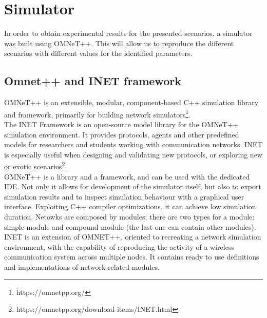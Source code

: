 %
\chapter{Simulator}\label{simulator}
In order to obtain experimental results for the presented scenarios, a simulator
was built using OMNeT++. This will allow us to reproduce the different scenarios
with different values for the identified parameters.\\
\section{Omnet++ and INET framework}
OMNeT++ is an extensible, modular, component-based C++ simulation library and
framework, primarily for building network simulators\footnote{https://omnetpp.org/}.\\
The INET Framework is an open-source model library for the OMNeT++ simulation
environment. It provides protocols, agents and other predefined models for
researchers and students working with communication networks. INET is especially
useful when designing and validating new protocols, or exploring new or exotic
scenarios\footnote{https://omnetpp.org/download-items/INET.html}.\\
OMNeT++ is a library and a framework, and can be used with the dedicated IDE.
Not only it allows for development of the simulator itself, but also to export
simulation results and to inspect simulation behaviour with a graphical user
interface. Exploiting C++ compiler optimizations, it can achieve low simulation
duration. Netowks are composed by modules; there are two types for a module:
simple module and compound module (the last one can contain other modules).
INET is an extension of OMNET++, oriented to recreating a network simulation
environment, with the capability of reproducing the activity of a wireless
communication system across multiple nodes. It contains ready to use definitions
and implementations of network related modules.
